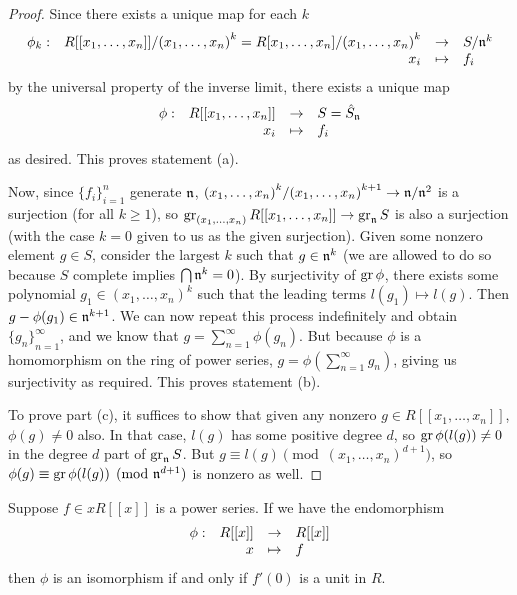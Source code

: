 \begin{proof}
    Since there exists a unique map for each \(k\)
    \begin{equation*}
        \begin{array}{rrcl} {\phi_k}: & {R[[x_1,\hdots,x_n]]/{(x_1,\hdots,x_n)}^k = R[x_1,\hdots,x_n]/{(x_1,\hdots,x_n)}^k} &\to & {S/\mathfrak{n}^k} \\ & {x_i} &\mapsto & {f_i} \end{array}
    \end{equation*}
    by the universal property of the inverse limit,
    there exists a unique map
    \begin{equation*}
        \begin{array}{rrcl} {\phi}: & {R[[x_1,\hdots,x_n]]} &\to & {S=\hat{S}_{\mathfrak{n}}} \\ & {x_i} &\mapsto & {f_i} \end{array}
    \end{equation*}
    as desired.
    This proves statement (a).

    Now, since \({\{f_i\}}_{i=1}^n\) generate \(\mathfrak{n}\),
    \({(x_1,\hdots,x_n)}^k/{(x_1,\hdots,x_n)}^{k+1} \to \mathfrak{n}/\mathfrak{n}^2\) is a surjection (for all \(k \geq 1\)),
    so \(\operatorname{gr}_{(x_1,\hdots,x_n)} R[[x_1,\hdots,x_n]] \to \operatorname{gr}_{\mathfrak{n}} S\) is also a surjection
    (with the case \(k = 0\) given to us as the given surjection).
    Given some nonzero element \(g \in S\),
    consider the largest \(k\) such that \(g \in \mathfrak{n}^k\)
    (we are allowed to do so because \(S\) complete implies \(\bigcap \mathfrak{n}^k = 0\)).
    By surjectivity of \(\operatorname{gr}\phi\), there exists some polynomial \(g_1 \in {(x_1,\hdots,x_n)}^k\)
    such that the leading terms \(l(g_1) \mapsto l(g)\).
    Then \(g-\phi(g_1) \in \mathfrak{n}^{k+1}\).
    We can now repeat this process indefinitely and obtain \({\{g_n\}}_{n=1}^\infty\),
    and we know that \(g = \sum_{n=1}^\infty \phi(g_n)\).
    But because \(\phi\) is a homomorphism on the ring of power series,
    \(g = \phi(\sum_{n=1}^\infty g_n)\), giving us surjectivity as required.
    This proves statement (b).

    To prove part (c), it suffices to show that given any nonzero \(g \in R[[x_1,\hdots,x_n]]\),
    \(\phi(g) \neq 0\) also.
    In that case, \(l(g)\) has some positive degree \(d\),
    so \(\operatorname{gr}\phi(l(g)) \neq 0\) in the degree \(d\) part of \(\operatorname{gr}_{\mathfrak{n}} S\).
    But \(g \equiv l(g) \pmod{{(x_1,\hdots,x_n)}^{d+1}}\),
    so \(\phi(g) \equiv \operatorname{gr}\phi(l(g)) \pmod{\mathfrak{n}^{d+1}}\) is nonzero as well.
\end{proof}
\begin{corollary}\label{cor:derivative-unit-isomorphism}
    Suppose \(f \in xR[[x]]\) is a power series.
    If we have the endomorphism
    \begin{equation*}
        \begin{array}{rrcl} {\phi}: & {R[[x]]} &\to & {R[[x]]} \\ & {x} &\mapsto & {f} \end{array}
    \end{equation*}
    then \(\phi\) is an isomorphism if and only if \(f'(0)\) is a unit in \(R\).
\end{corollary}
